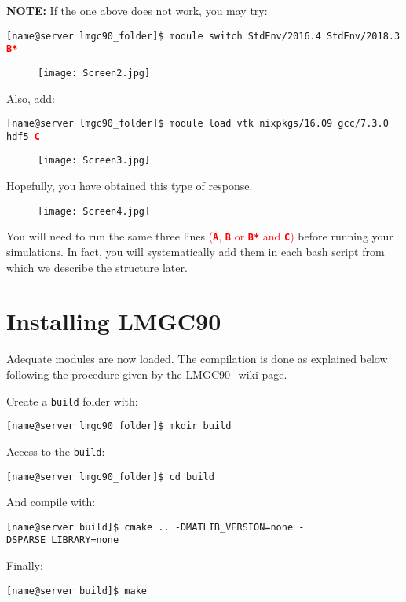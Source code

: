 \documentclass[12pt]{article}
\begin{document}
\textbf{NOTE:} If the one above does not work, you may try:
\begin{tcolorbox}
\texttt{[name@server lmgc90\_folder]\$ module switch StdEnv/2016.4 StdEnv/2018.3 \textcolor{red}{\textbf{B*}}} 
\end{tcolorbox}
\begin{figure}[H]
  \centering
  \texttt{[image: Screen2.jpg]}
\end{figure}

Also, add:
\begin{tcolorbox}
\texttt{[name@server lmgc90\_folder]\$ module load vtk nixpkgs/16.09 gcc/7.3.0 hdf5 \textcolor{red}{\textbf{C}}} 
\end{tcolorbox}
\begin{figure}[H]
  \centering
  \texttt{[image: Screen3.jpg]}
\end{figure}
\vspace{1cm}
Hopefully, you have obtained this type of response.
\begin{figure}[H]
  \centering
  \texttt{[image: Screen4.jpg]}
\end{figure}
You will need to run the same three lines \textcolor{red}{(\texttt{\textbf{A}}, \texttt{\textbf{B}} or \texttt{\textbf{B*}} and \texttt{\textbf{C}})} before running your simulations. In fact, you will systematically add them in each bash script from which we describe the structure later.

\section*{Installing LMGC90}

Adequate modules are now loaded. The compilation is done as explained below following the procedure given by the \href{https://git-xen.lmgc.univ-montp2.fr/lmgc90/lmgc90_user/-/wikis/Compilation}{\underline{LMGC90\_wiki page}}. 

Create a \texttt{build} folder with:
\begin{tcolorbox}
\texttt{[name@server lmgc90\_folder]\$ mkdir build} 
\end{tcolorbox}
Access to the \texttt{build}:
\begin{tcolorbox}
\texttt{[name@server lmgc90\_folder]\$ cd build}
\end{tcolorbox}
And compile with:
\begin{tcolorbox}
\texttt{[name@server build]\$ cmake .. -DMATLIB\_VERSION=none -DSPARSE\_LIBRARY=none} 
\end{tcolorbox}
\vspace{1.5cm}
Finally:
\begin{tcolorbox}
\texttt{[name@server build]\$ make} 
\end{tcolorbox}
\end{document}
